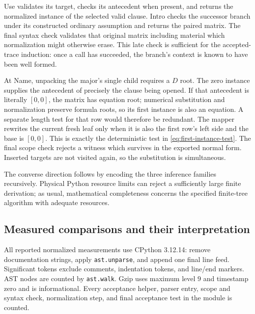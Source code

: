 Use validates its target, checks its antecedent when present, and returns
the normalized instance of the selected valid clause. Intro checks the
successor branch under its constructed ordinary assumption and returns
the paired matrix. The final syntax check validates that original matrix
including material which normalization might otherwise erase. This
late check is sufficient for the accepted-trace induction: once a call
has succeeded, the branch's context is known to have been well formed.

At Name, unpacking the major's single child requires a $D$ root. The
zero instance supplies the antecedent of precisely the clause being
opened. If that antecedent is literally $[0,0]$, the matrix has equation
root; numerical substitution and normalization preserve formula roots,
so its first instance is also an equation. A separate length test for
that row would therefore be redundant. The mapper rewrites the current
fresh leaf only when it is also the first row's left side and the base
is $[0,0]$. This is exactly the deterministic test in
\eqref{eq:first-instance-test}. The final scope check rejects a witness
which survives in the exported normal form. Inserted targets are not
visited again, so the substitution is simultaneous.

The converse direction follows by encoding the three inference families
recursively. Physical Python resource limits can reject a sufficiently
large finite derivation; as usual, mathematical completeness concerns
the specified finite-tree algorithm with adequate resources.

\subsection{Measured comparisons and their interpretation}

All reported normalized measurements use CPython 3.12.14: remove
documentation strings, apply \texttt{ast.unparse}, and append one final
line feed. Significant tokens exclude comments, indentation tokens,
and line/end markers. AST nodes are counted by \texttt{ast.walk}.
Gzip uses maximum level $9$ and timestamp zero and is informational.
Every acceptance helper, parser entry, scope and syntax check,
normalization step, and final acceptance test in the module is counted.

